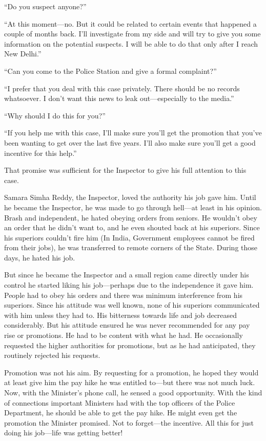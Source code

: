 “Do you suspect anyone?”

“At this moment—no. But it could be related to certain events that happened a
couple of months back. I'll investigate from my side and will try to give you
some information on the potential suspects. I will be able to do that only after
I reach New Delhi.”

“Can you come to the Police Station and give a formal complaint?”

“I prefer that you deal with this case privately. There should be no records
whatsoever. I don't want this news to leak out—especially to the media.”

“Why should I do this for you?”

“If you help me with this case, I'll make sure you'll get the promotion that
you've been wanting to get over the last five years. I'll also make sure you'll
get a good incentive for this help.”

That promise was sufficient for the Inspector to give his full attention to this
case.

Samara Simha Reddy, the Inspector, loved the authority his job gave him. Until
he became the Inspector, he was made to go through hell—at least in his
opinion. Brash and independent, he hated obeying orders from seniors. He
wouldn't obey an order that he didn't want to, and he even shouted back at his
superiors. Since his superiors couldn't fire him (In India, Government employees
cannot be fired from their jobs), he was transferred to remote corners of the
State. During those days, he hated his job.

But since he became the Inspector and a small region came directly under his
control he started liking his job—perhaps due to the independence it gave him.
People had to obey his orders and there was minimum interference from his
superiors. Since his attitude was well known, none of his superiors communicated
with him unless they had to. His bitterness towards life and job decreased
considerably. But his attitude ensured he was never recommended for any pay rise
or promotions. He had to be content with what he had. He occasionally requested
the higher authorities for promotions, but as he had anticipated, they routinely
rejected his requests.

Promotion was not his aim. By requesting for a promotion, he hoped they would at
least give him the pay hike he was entitled to—but there was not much luck.
Now, with the Minister's phone call, he sensed a good opportunity. With the kind
of connections important Ministers had with the top officers of the Police
Department, he should be able to get the pay hike. He might even get the
promotion the Minister promised. Not to forget—the incentive. All this for
just doing his job—life was getting better!